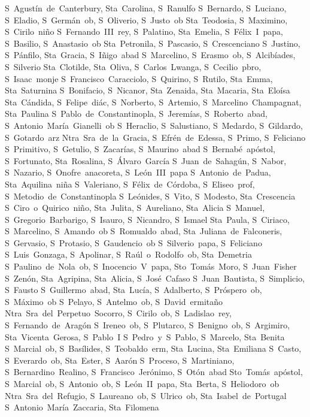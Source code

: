 S~Agust\'in~de~Canterbury, Sta~Carolina, S~Ranulfo
S~Bernardo, S~Luciano, S~Eladio, S~Germ\'an~ob, S~Oliverio, S~Justo~ob
Sta~Teodosia, S~Maximino, S~Cirilo~ni\~no
S~Fernando~III~rey, S~Palatino, Sta~Emelia, S~F\'elix~I~papa, S~Basilio, S~Anastasio~ob
Sta~Petronila, S~Pascasio, S~Crescenciano
S~Justino, S~P\'anfilo, Sta~Gracia, S~I\~nigo~abad
S~Marcelino, S~Erasmo~ob, S~Alcib\'iades, S~Silverio
Sta~Clotilde, Sta~Oliva, S~Carlos~Lwanga, S~Cecilio~pbro, S~Isaac~monje
S~Francisco~Caracciolo, S~Quirino, S~Rutilo, Sta~Emma, Sta~Saturnina
S~Bonifacio, S~Nicanor, Sta~Zenaida, Sta~Macaria, Sta~Elo\'isa
Sta~C\'andida, S~Felipe~di\'ac, S~Norberto, S~Artemio, S~Marcelino~Champagnat, Sta~Paulina
S~Pablo~de~Constantinopla, S~Jerem\'ias, S~Roberto~abad, S~Antonio~Mar\'ia~Gianelli~ob
S~Heraclio, S~Salustiano, S~Medardo, S~Gildardo, S~Gotardo~arz
Ntra~Sra~de~la~Gracia, S~Efr\'en~de~Edessa, S~Primo, S~Feliciano
S~Primitivo, S~Getulio, S~Zacar\'ias, S~Maurino~abad
S~Bernab\'e~ap\'ostol, S~Fortunato, Sta~Rosalina, S~\'Alvaro~Garc\'ia
S~Juan~de~Sahag\'un, S~Nabor, S~Nazario, S~Onofre~anacoreta, S~Le\'on~III~papa
S~Antonio~de~Padua, Sta~Aquilina~ni\~na
S~Valeriano, S~F\'elix~de~C\'ordoba, S~Eliseo~prof, S~Metodio~de~Constantinopla
S~Le\'onides, S~Vito, S~Modesto, Sta~Crescencia
S~Ciro~o~Quirico~ni\~no, Sta~Julita, S~Aureliano, Sta~Alicia
S~Manuel, S~Gregorio~Barbarigo, S~Isauro, S~Nicandro, S~Ismael
Sta~Paula, S~Ciriaco, S~Marcelino, S~Amando~ob
S~Romualdo~abad, Sta~Juliana~de~Falconeris, S~Gervasio, S~Protasio, S~Gaudencio~ob
S~Silverio~papa, S~Feliciano
S~Luis~Gonzaga, S~Apolinar, S~Ra\'ul~o~Rodolfo~ob, Sta~Demetria
S~Paulino~de~Nola~ob, S~Inocencio~V~papa, Sto~Tom\'as~Moro, S~Juan~Fisher
S~Zen\'on, Sta~Agripina, Sta~Alicia, S~Jos\'e~Cafaso
S~Juan~Bautista, S~Simplicio, S~Fausto
S~Guillermo~abad, Sta~Luc\'ia, S~Adalberto, S~Pr\'ospero~ob, S~M\'aximo~ob
S~Pelayo, S~Antelmo~ob, S~David~ermita\~no
Ntra~Sra~del~Perpetuo~Socorro, S~Cirilo~ob, S~Ladislao~rey, S~Fernando~de~Arag\'on
S~Ireneo~ob, S~Plutarco, S~Benigno~ob, S~Argimiro, Sta~Vicenta~Gerosa, S~Pablo~I%
S~Pedro~y~S~Pablo, S~Marcelo, Sta~Benita
S~Marcial~ob, S~Bas\'ilides, S~Teobaldo~erm, Sta~Lucina, Sta~Emiliana
S~Casto, S~Everardo~ob, Sta~Ester, S~Aar\'on
S~Proceso, S~Martiniano, S~Bernardino~Realino, S~Francisco~Jer\'onimo, S~Ot\'on~abad
Sto~Tom\'as~ap\'ostol, S~Marcial~ob, S~Antonio~ob, S~Le\'on~II~papa, Sta~Berta, S~Heliodoro~ob
Ntra~Sra~del~Refugio, S~Laureano~ob, S~Ulrico~ob, Sta~Isabel~de~Portugal
S~Antonio~Mar\'ia~Zaccaria, Sta~Filomena
